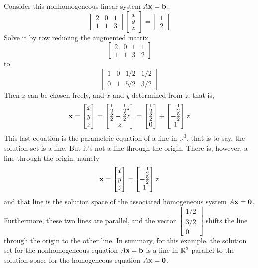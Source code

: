 \begin{example}
Consider this nonhomogeneous linear system $A{\bf x}={\bf b}$:
$$\begin{bmatrix}
2&0&1\\
1&1&3
\end{bmatrix}
\begin{bmatrix}x\\y\\z\end{bmatrix}
=
\begin{bmatrix}1\\2\end{bmatrix}
$$
Solve it by row reducing the augmented matrix
$$\left[\begin{array}{rrr|r}
2&0&1&1\\
1&1&3&2
\end{array}\right]$$
to
$$\left[\begin{array}{rrr|r}
1&0&1/2&1/2\\
0&1&5/2&3/2
\end{array}\right]$$
Then $z$ can be chosen freely, and $x$ and $y$ determined from $z$, that is,
$${\bf x}=
\begin{bmatrix}x\\y\\z\end{bmatrix}
=
\begin{bmatrix}
{1\over2}-{1\over2}z\\
{3\over2}-{5\over2}z\\
z
\end{bmatrix}
=
\begin{bmatrix}
{1\over2}\\
{3\over2}\\
0
\end{bmatrix}
+
\begin{bmatrix}
-{1\over2}\\
-{5\over2}\\
1
\end{bmatrix}z
$$
This last equation is the parametric equation of a line in $\mathbb{R}^3$, that is to say, the solution set is a line.  But it's not a line through the origin. There is, however, a line through the origin, namely
$${\bf x}=
\begin{bmatrix}x\\y\\z\end{bmatrix}
=
\begin{bmatrix}
-{1\over2}\\
-{5\over2}\\
1
\end{bmatrix}z
$$
and that line is the solution space of the associated homogeneous system
$A{\bf x}={\bf 0}$.  Furthermore, these two lines are parallel, and the vector
$\displaystyle\begin{bmatrix}
1/2\\
3/2\\
0
\end{bmatrix}$ 
shifts the line through the origin to the other line.
In summary, for this example, the solution set for the nonhomogeneous
equation $A{\bf x}={\bf b}$ is a line in $\mathbb{R}^3$ parallel to the solution
space for the homogeneous equation $A{\bf x}={\bf 0}$.
\end{example}

